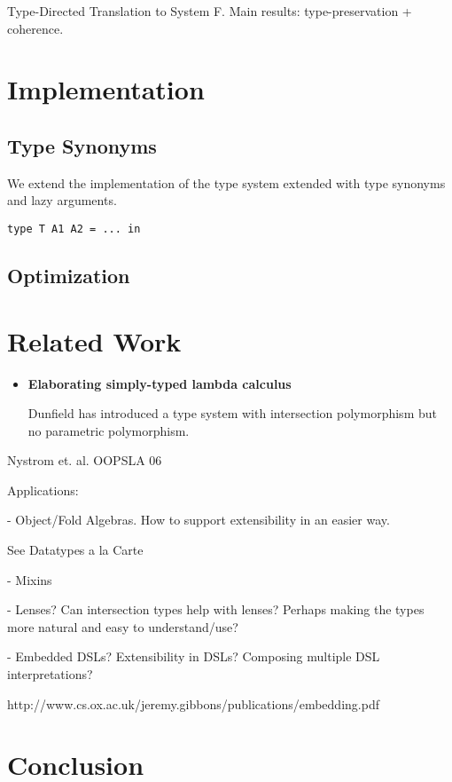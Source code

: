 \documentclass[preprint]{sigplanconf}
\begin{document}
Type-Directed Translation to System F.
Main results: type-preservation + coherence.

\section{Implementation}

\subsection{Type Synonyms}

We extend the implementation of the type system extended with type synonyms and
lazy arguments.

\begin{lstlisting}
type T A1 A2 = ... in
\end{lstlisting}

\subsection{Optimization}
\section{Related Work}

\begin{itemize}

\item{\bf Elaborating simply-typed lambda calculus}

  Dunfield has introduced a type system with intersection polymorphism but no
  parametric polymorphism.

\end{itemize}

Nystrom et. al. OOPSLA 06

Applications:

- Object/Fold Algebras. How to support extensibility in an easier way.

See Datatypes a la Carte

- Mixins

- Lenses? Can intersection types help with lenses? Perhaps making the
types more natural and easy to understand/use?

- Embedded DSLs? Extensibility in DSLs? Composing multiple DSL interpretations?

http://www.cs.ox.ac.uk/jeremy.gibbons/publications/embedding.pdf

\section{Conclusion}
\end{document}
